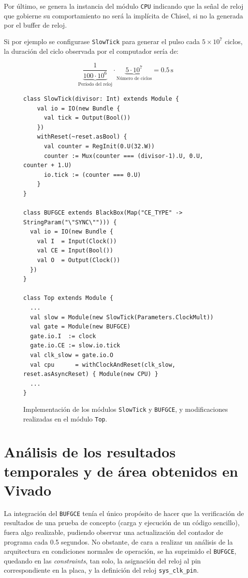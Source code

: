 Por último, se genera la instancia del módulo \texttt{CPU} indicando que la señal de reloj que gobierne su comportamiento no será la implícita de Chisel, si no la generada por el buffer de reloj.

Si por ejemplo se configurase \texttt{SlowTick} para generar el pulso cada $5 \times 10^{7}$ ciclos, la duración del ciclo observada por el computador sería de:

\[
\underbrace{\frac{1}{100 \cdot 10^{6}}}_{\text{Período del reloj}}
\cdot
\underbrace{5 \cdot 10^{7}}_{\text{Número de ciclos}}
=
0.5\,\text{s}
\]

\vspace{+0.2cm}
\begin{figure}[h!!!]
\begin{lstlisting}[style=scalaStyleSmaller]
class SlowTick(divisor: Int) extends Module {
    val io = IO(new Bundle {
      val tick = Output(Bool())
    })
    withReset(~reset.asBool) {
      val counter = RegInit(0.U(32.W))
      counter := Mux(counter === (divisor-1).U, 0.U, counter + 1.U)
      io.tick := (counter === 0.U)
    }
}

class BUFGCE extends BlackBox(Map("CE_TYPE" -> StringParam("\"SYNC\""))) {
  val io = IO(new Bundle {
    val I  = Input(Clock())
    val CE = Input(Bool())
    val O  = Output(Clock())
  })
}

class Top extends Module {
  ...
  val slow = Module(new SlowTick(Parameters.ClockMult))
  val gate = Module(new BUFGCE)
  gate.io.I  := clock
  gate.io.CE := slow.io.tick
  val clk_slow = gate.io.O
  val cpu      = withClockAndReset(clk_slow, reset.asAsyncReset) { Module(new CPU) }
  ...
}
\end{lstlisting}
\vspace{-0.1cm}
\caption{Implementación de los módulos \texttt{SlowTick} y \texttt{BUFGCE}, y modificaciones realizadas en el módulo \texttt{Top}.}
\end{figure}

\section{Análisis de los resultados temporales y de área obtenidos en Vivado}

La integración del \texttt{BUFGCE} tenía el único propósito de hacer que la verificación de resultados de una prueba de concepto (carga y ejecución de un código sencillo), fuera algo realizable, pudiendo observar una actualización del contador de programa cada 0.5 segundos. No obstante, de cara a realizar un análisis de la arquitectura en condiciones normales de operación, se ha suprimido el \texttt{BUFGCE}, quedando en las \textit{constraints}, tan solo, la asignación del reloj al pin correspondiente en la placa, y la definición del reloj \texttt{sys\_clk\_pin}.

